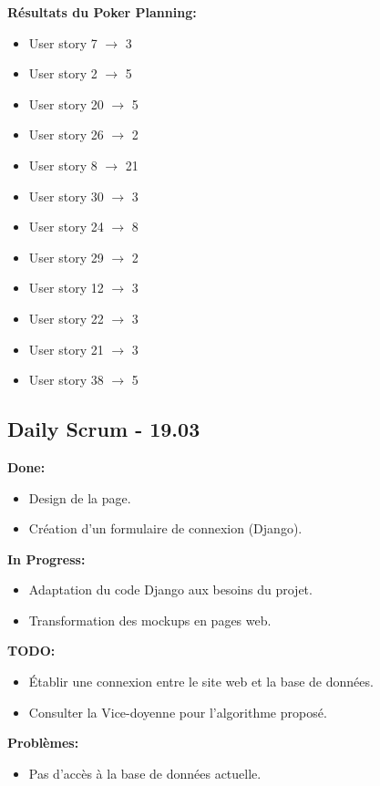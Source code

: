 \documentclass[11pt]{article}
\begin{document}
\textbf{Résultats du Poker Planning:}
\begin{itemize}
    \item User story 7 $\rightarrow$ 3
    \item User story 2 $\rightarrow$ 5
    \item User story 20 $\rightarrow$ 5
    \item User story 26 $\rightarrow$ 2
    \item User story 8 $\rightarrow$ 21
    \item User story 30 $\rightarrow$ 3
    \item User story 24 $\rightarrow$ 8
    \item User story 29 $\rightarrow$ 2
    \item User story 12 $\rightarrow$ 3
    \item User story 22 $\rightarrow$ 3
    \item User story 21 $\rightarrow$ 3
    \item User story 38 $\rightarrow$ 5
\end{itemize}








\subsection*{{\color{navy}Daily Scrum - 19.03}}
\textbf{Done:}
\begin{itemize}
  \item Design de la page.
  \item Création d'un formulaire de connexion (Django).
\end{itemize}
\textbf{In Progress:}
\begin{itemize}
  \item Adaptation du code Django aux besoins du projet.
  \item Transformation des mockups en pages web.
\end{itemize}
\textbf{TODO:}
\begin{itemize}
  \item Établir une connexion entre le site web et la base de données.
  \item Consulter la Vice-doyenne pour l'algorithme proposé.
\end{itemize}
\textbf{Problèmes:}
\begin{itemize}
  \item Pas d'accès à la base de données actuelle.
\end{itemize}
\end{document}
